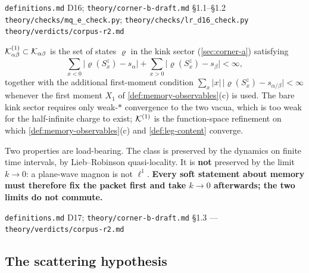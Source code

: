 %
{\texttt{definitions.md} D16; \texttt{theory/corner-b-draft.md} \S1.1--\S1.2}%
{\texttt{theory/checks/mq\_e\_check.py};
 \texttt{theory/checks/lr\_d16\_check.py}}%
{\texttt{theory/verdicts/corpus-r2.md}}

\begin{definition}
\label{def:l1-kink-class}
$\mathcal{K}^{(1)}_{\alpha\beta}\subset\mathcal{K}_{\alpha\beta}$ is the set of states
$\varrho$ in the kink sector (\cref{sec:corner-a}) satisfying
\begin{equation}
  \sum_{x<0}\bigl|\varrho(S^z_x)-s_\alpha\bigr|
  +\sum_{x>0}\bigl|\varrho(S^z_x)-s_\beta\bigr|<\infty,
  \label{eq:l1class}
\end{equation}
together with the additional first-moment condition
$\sum_x|x|\,\bigl|\varrho(S^z_x)-s_{\alpha/\beta}\bigr|<\infty$ whenever the
first moment $X_1$ of \cref{def:memory-observables}(c) is used. The bare kink
sector requires only weak-$*$ convergence to the two vacua, which is too weak
for the half-infinite charge to exist; $\mathcal{K}^{(1)}$ is the function-space
refinement on which \cref{def:memory-observables}(c) and \cref{def:leg-content}
converge.

Two properties are load-bearing. The class is preserved by the dynamics on
finite time intervals, by Lieb--Robinson quasi-locality. It is \textbf{not}
preserved by the limit $k\to0$: a plane-wave magnon is not $\ell^1$.
\textbf{Every soft statement about memory must therefore fix the packet first
and take $k\to0$ afterwards; the two limits do not commute.}
\end{definition}

%
{\texttt{definitions.md} D17; \texttt{theory/corner-b-draft.md} \S1.3}%
{---}%
{\texttt{theory/verdicts/corpus-r2.md}}

\subsection{The scattering hypothesis}


